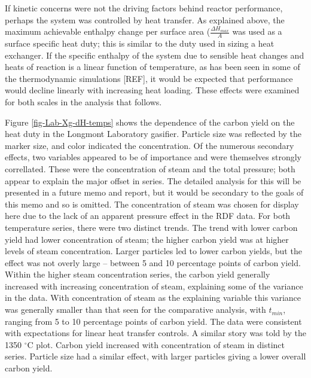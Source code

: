 \documentclass[11pt,twocolumn]{article}
\begin{document}
If kinetic concerns were not the driving factors behind reactor performance, perhaps the system was controlled by heat transfer.  As explained above, the maximum achievable enthalpy change per surface area ($\frac{\Delta H_{max}}{A}$ was used as a surface specific heat duty; this is similar to the duty used in sizing a heat exchanger.  If the specific enthalpy of the system due to sensible heat changes and heats of reaction is a linear function of temperature, as has been seen in some of the thermodynamic simulations [REF], it would be expected that performance would decline linearly with increasing heat loading.  These effects were examined for both scales in the analysis that follows.

Figure \ref{fig-Lab-Xg-dH-temps} shows the dependence of the carbon yield on the heat duty in the Longmont Laboratory gasifier.  Particle size was reflected by the marker size, and color indicated the concentration.  Of the numerous secondary effects, two variables appeared to be of importance and were themselves strongly correllated.  These were the concentration of steam and the total pressure; both appear to explain the major offset in series.  The detailed analysis for this will be presented in a future memo and report, but it would be secondary to the goals of this memo and so is omitted.  The concentration of steam was chosen for display here due to the lack of an apparent pressure effect in the RDF data.  For both temperature series, there were two distinct trends.  The trend with lower carbon yield had lower concentration of steam; the higher carbon yield was at higher levels of steam concentration.  Larger particles led to lower carbon yields, but the effect was not overly large -- between 5 and 10 percentage points of carbon yield.  Within the higher steam concentration series, the carbon yield generally increased with increasing concentration of steam, explaining some of the variance in the data.  With concentration of steam as the explaining variable this variance was generally smaller than that seen for the comparative analysis, with $t_{min}$, ranging from 5 to 10 percentage points of carbon yield.  The data were consistent with expectations for linear heat transfer controls.  A similar story was told by the 1350 $^{\circ}$C plot.  Carbon yield increased with concentration of steam in distinct series.  Particle size had a similar effect, with larger particles giving a lower overall carbon yield.
\end{document}
